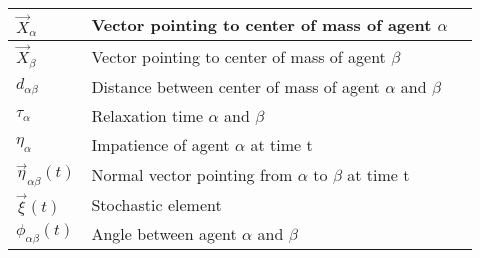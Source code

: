 \begin{center}
\begin{tabular}{lll}
\hline
$\vec{X}_{\alpha}$ & Vector pointing to center of mass of agent $\alpha$ & \\
\hline
$\vec{X}_{\beta}$ & Vector pointing to center of mass of agent $\beta$ & \\
\hline
$d_{\alpha \beta}$ & Distance between center of mass of agent $\alpha$ and $\beta$ & \\
\hline
$\tau_{\alpha}$ & Relaxation time $\alpha$ and $\beta$ & \\
\hline
$\eta_{\alpha}$ & Impatience of agent $\alpha$ at time t & \\
\hline
$\vec{\eta}_{\alpha \beta}\left( t \right)$ & Normal vector pointing from $\alpha$ to $\beta$ at time t & \\
\hline
$\vec{\xi}\left( t \right)$ & Stochastic element & \\
\hline
$\phi_{\alpha \beta} \left( t \right)$ & Angle between agent $\alpha$ and $\beta$ & \\
\hline
\end{tabular}
\end{center}
